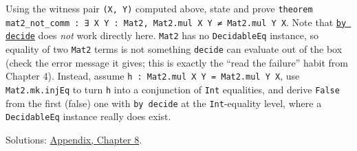 \begin{enumerate}
  Using the witness pair \texttt{(X, Y)} computed above, state and prove \texttt{theorem mat2\_\allowbreak{}not\_\allowbreak{}comm : ∃ X Y : Mat2, Mat2.mul X Y ≠ Mat2.mul Y X}. Note that \href{https://lean-lang.org/doc/reference/latest/Tactic-Proofs/Tactic-Reference/}{\texttt{by decide}} does \emph{not} work directly here. \texttt{Mat2} has no \texttt{DecidableEq} instance, so equality of two \texttt{Mat2} terms is not something \texttt{decide} can evaluate out of the box (check the error message it gives; this is exactly the ``read the failure'' habit from Chapter 4). Instead, assume \texttt{h : Mat2.mul X Y = Mat2.mul Y X}, use \texttt{Mat2.mk.injEq} to turn \texttt{h} into a conjunction of \texttt{Int} equalities, and derive \texttt{False} from the first (false) one with \texttt{by decide} at the \texttt{Int}-equality level, where a \texttt{DecidableEq} instance really does exist.
\end{enumerate}

Solutions: \hyperref[sec:14-appendix-solutions:07-chapter-8:1]{Appendix, Chapter 8}.

